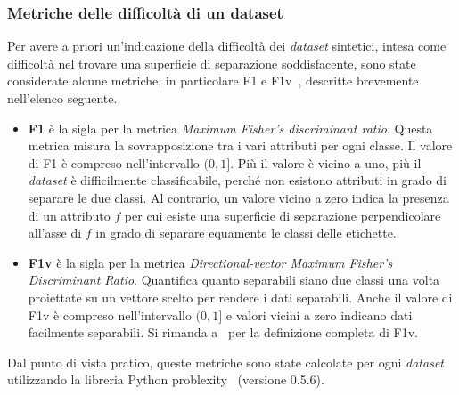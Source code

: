 \subsubsection{Metriche delle difficoltà di un dataset}\label{sec:metriche_dataset}
Per avere a priori un'indicazione della difficoltà dei \emph{dataset} sintetici, intesa come difficoltà nel trovare una superficie di separazione soddisfacente, sono state considerate alcune metriche, in particolare F1 e F1v~\cite{ds_complexity}, descritte brevemente nell'elenco seguente.
\begin{itemize}
    \item \textbf{F1} è la sigla per la metrica \emph{Maximum Fisher’s discriminant ratio}. Questa metrica misura la sovrapposizione tra i vari attributi per ogni classe.
    Il valore di F1 è compreso nell'intervallo $(0,1]$. Più il valore è vicino a uno, più il \emph{dataset} è difficilmente classificabile, perché non esistono attributi in grado di separare le due classi. Al contrario, un valore vicino a zero indica la presenza di un attributo $f$ per cui esiste una superficie di separazione perpendicolare all'asse di $f$ in grado di separare equamente le classi delle etichette.
    \item \textbf{F1v} è la sigla per la metrica \emph{Directional-vector Maximum Fisher’s Discriminant Ratio}. Quantifica quanto separabili siano due classi una volta proiettate su un vettore scelto per rendere i dati separabili.
    Anche il valore di F1v è compreso nell'intervallo $(0,1]$ e valori vicini a zero indicano dati facilmente separabili.    
    Si rimanda a~\cite{ds_complexity} per la definizione completa di F1v.
\end{itemize}

Dal punto di vista pratico, queste metriche sono state calcolate per ogni \emph{dataset} utilizzando la libreria Python problexity~\cite{problexity} (versione 0.5.6).


